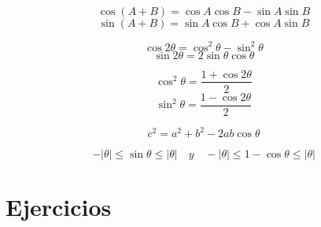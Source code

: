 \begin{tcolorbox}[colframe=white]
    \begin{prop}
	$$\cos(A+B)=\cos A \cos B - \sin A \sin B$$
	$$\sin(A+B) = \sin A \cos B + \cos A \sin B$$
    \end{prop}
\end{tcolorbox}

\begin{tcolorbox}[colframe=white]
    \begin{prop}
	$$\cos 2\theta = \cos^2 \theta - \sin^2 \theta$$
	$$\sin 2\theta = 2\sin \theta \cos \theta$$
    \end{prop}
\end{tcolorbox}

\begin{tcolorbox}[colframe=white]
    \begin{prop}
	$$\cos^2 \theta = \dfrac{1 + \cos 2\theta}{2}$$
	$$\sin^2 \theta = \dfrac{1 - \cos 2\theta}{2}$$
    \end{prop}
\end{tcolorbox}

\begin{tcolorbox}[colframe=white]
    \begin{prop}
	$$c^2 = a^2 + b^2 - 2ab \cos \theta$$
    \end{prop}
\end{tcolorbox}

\begin{tcolorbox}[colframe=white]
    \begin{prop}
	$$-|\theta| \leq \sin \theta \leq |\theta| \quad y \quad -|\theta| \leq 1 - \cos \theta \leq |\theta|$$
    \end{prop}
\end{tcolorbox}


\setcounter{section}{2}
\section{Ejercicios}

